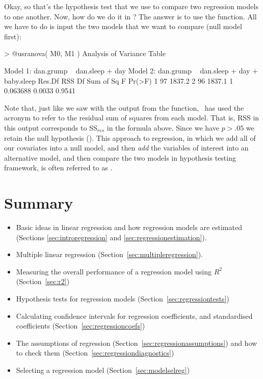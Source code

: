 Okay, so that's the hypothesis test that we use to compare two regression models to one another. Now, how do we do it in \R? The answer is to use the  function. All we have to do is input the two models that we want to compare (null model first):
\begin{rblock1}
> @usr{anova( M0, M1 )}
Analysis of Variance Table

Model 1: dan.grump ~ dan.sleep + day
Model 2: dan.grump ~ dan.sleep + day + baby.sleep
  Res.Df    RSS Df Sum of Sq      F Pr(>F)
1     97 1837.2                           
2     96 1837.1  1  0.063688 0.0033 0.9541
\end{rblock1}
Note that, just like we saw with the output from the  function, \R\ has used the acronym  to refer to the residual sum of squares from each model. That is, RSS in this output corresponds to SS$_{res}$ in the formula above.  Since we have $p>.05$ we retain the null hypothesis ().  This approach to regression, in which we add all of our covariates into a null model, and then {\it add} the variables of interest into an alternative model, and then compare the two models in hypothesis testing framework, is often referred to as .

\section{Summary}

\begin{itemize} \itemsep -2pt
\item Basic ideas in linear regression and how regression models are estimated (Sections \ref{sec:introregression} and \ref{sec:regressionestimation}).
\item Multiple linear regression (Section~\ref{sec:multipleregression}). 
\item Measuring the overall performance of a regression model using $R^2$ (Section~\ref{sec:r2})
\item Hypothesis tests for regression models (Section~\ref{sec:regressiontests})
\item Calculating confidence intervals for regression coefficients, and standardised coefficients (Section~\ref{sec:regressioncoefs})
\item The assumptions of regression (Section~\ref{sec:regressionassumptions}) and how to check them (Section~\ref{sec:regressiondiagnostics})
\item Selecting a regression model (Section~\ref{sec:modelselreg})
\end{itemize}









\fi %

